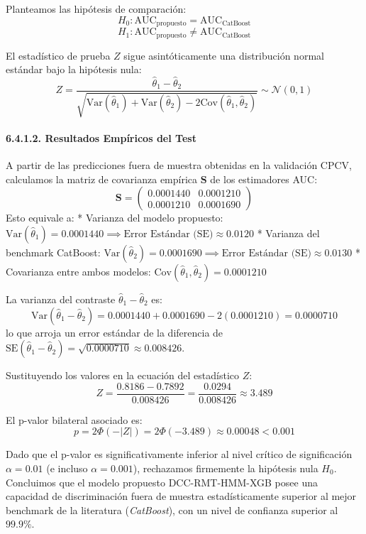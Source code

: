 \documentclass[
  12pt,
]{article}
\begin{document}
Planteamos las hipótesis de comparación:
\[H_0: \text{AUC}_{\text{propuesto}} = \text{AUC}_{\text{CatBoost}}\]
\[H_1: \text{AUC}_{\text{propuesto}} \neq \text{AUC}_{\text{CatBoost}}\]

El estadístico de prueba \(Z\) sigue asintóticamente una distribución
normal estándar bajo la hipótesis nula:
\[Z = \frac{\hat{\theta}_1 - \hat{\theta}_2}{\sqrt{\text{Var}(\hat{\theta}_1) + \text{Var}(\hat{\theta}_2) - 2 \text{Cov}(\hat{\theta}_1, \hat{\theta}_2)}} \sim \mathcal{N}(0, 1)\]

\paragraph{6.4.1.2. Resultados Empíricos del
Test}\label{c.1.2.-resultados-empuxedricos-del-test}

A partir de las predicciones fuera de muestra obtenidas en la validación
CPCV, calculamos la matriz de covarianza empírica \(\mathbf{S}\) de los
estimadores AUC:
\[\mathbf{S} = \begin{pmatrix} 0.0001440 & 0.0001210 \\ 0.0001210 & 0.0001690 \end{pmatrix}\]
Esto equivale a: * Varianza del modelo propuesto:
\(\text{Var}(\hat{\theta}_1) = 0.0001440 \implies \text{Error Estándar (SE)} \approx 0.0120\)
* Varianza del benchmark CatBoost:
\(\text{Var}(\hat{\theta}_2) = 0.0001690 \implies \text{Error Estándar (SE)} \approx 0.0130\)
* Covarianza entre ambos modelos:
\(\text{Cov}(\hat{\theta}_1, \hat{\theta}_2) = 0.0001210\)

La varianza del contraste \(\hat{\theta}_1 - \hat{\theta}_2\) es:
\[\text{Var}(\hat{\theta}_1 - \hat{\theta}_2) = 0.0001440 + 0.0001690 - 2(0.0001210) = 0.0000710\]
lo que arroja un error estándar de la diferencia de
\(\text{SE}(\hat{\theta}_1 - \hat{\theta}_2) = \sqrt{0.0000710} \approx 0.008426\).

Sustituyendo los valores en la ecuación del estadístico \(Z\):
\[Z = \frac{0.8186 - 0.7892}{0.008426} = \frac{0.0294}{0.008426} \approx 3.489\]

El p-valor bilateral asociado es:
\[p = 2 \Phi(-|Z|) = 2 \Phi(-3.489) \approx 0.00048 < 0.001\]

Dado que el p-valor es significativamente inferior al nivel crítico de
significación \(\alpha = 0.01\) (e incluso \(\alpha = 0.001\)),
rechazamos firmemente la hipótesis nula \(H_0\). Concluimos que el
modelo propuesto DCC-RMT-HMM-XGB posee una capacidad de discriminación
fuera de muestra estadísticamente superior al mejor benchmark de la
literatura (\emph{CatBoost}), con un nivel de confianza superior al
\(99.9\%\).
\end{document}
